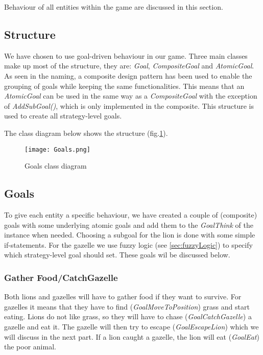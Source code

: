 Behaviour of all entities within the game are discussed in this section.

\subsection{Structure}\label{subsec:behaviourStructure}
We have chosen to use goal-driven behaviour in our game.
Three main classes make up most of the structure, they are: \textit{Goal}, \textit{CompositeGoal} and \textit{AtomicGoal}.
As seen in the naming, a composite design pattern has been used to enable the grouping of goals while keeping the same functionalities.
This means that an \textit{AtomicGoal} can be used in the same way as a \textit{CompositeGoal} with the exception of \textit{AddSubGoal()},
which is only implemented in the composite.
This structure is used to create all strategy-level goals.

The class diagram below shows the structure (fig.\ref{fig:behaviourClassDiagram}).

\begin{figure}[h!]
    \begin{center}
        \texttt{[image: Goals.png]}
    \end{center}
    \caption{Goals class diagram}
    \label{fig:behaviourClassDiagram}
\end{figure}


\subsection{Goals}\label{subsec:behaviourGoals}
To give each entity a specific behaviour, we have created a couple of (composite) goals with some underlying atomic goals
and add them to the \textit{GoalThink} of the instance when needed.
Choosing a subgoal for the lion is done with some simple if-statements.
For the gazelle we use fuzzy logic (see \ref{sec:fuzzyLogic}) to specify which strategy-level goal should set.
These goals wil be discussed below.

\subsubsection{Gather Food/CatchGazelle}\label{sec:behaviourFood}
Both lions and gazelles will have to gather food if they want to survive.
For gazelles it means that they have to find (\textit{GoalMoveToPosition}) grass and start eating.
Lions do not like grass, so they will have to chase (\textit{GoalCatchGazelle}) a gazelle and eat it.
The gazelle will then try to escape (\textit{GoalEscapeLion}) which we will discuss in the next part.
If a lion caught a gazelle, the lion will eat (\textit{GoalEat}) the poor animal.

